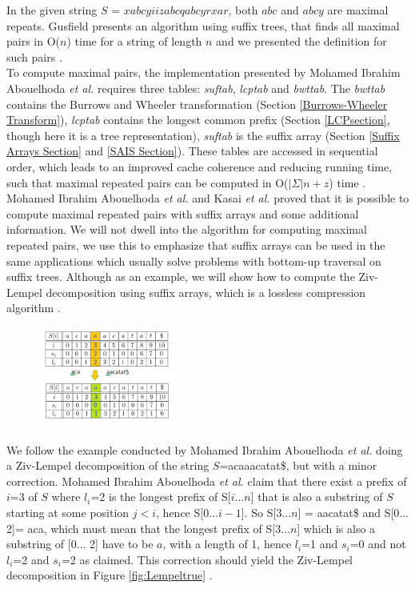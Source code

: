 \documentclass[12pt]{article} %
\begin{document}
In the given string $S$ = $xabcyiizabcqabcyrxar$, both $abc$ and $abcy$ are maximal repeats. Gusfield presents an algorithm using suffix trees, that finds all maximal pairs in O($n$) time for a string of length $n$ and we presented the definition for such pairs \cite{gusfield}.
\\
To compute maximal pairs, the implementation presented by Mohamed Ibrahim Abouelhoda \emph{et al.} \cite{enchancedsuffix} requires three tables: \emph{suftab}, \emph{lcptab} and \emph{bwttab}. The \emph{bwttab} contains the Burrows and Wheeler transformation (Section \ref{Burrows-Wheeler Transform}),  \emph{lcptab} contains the  longest common prefix (Section \ref{LCPsection}, though here it is a tree representation), \emph{suftab} is the suffix array (Section \ref{Suffix Arrays Section} and \ref{SAIS Section})\cite{enchancedsuffix}. These tables are accessed in sequential order, which leads to an improved cache coherence and reducing running time, such that maximal repeated pairs can be computed in O($|\Sigma|n + z$)  time \cite{enchancedsuffix}. Mohamed Ibrahim Abouelhoda \emph{et al.} \cite{enchancedsuffix} and Kasai \emph{et al.} \cite{Kasai} proved that it is possible to compute maximal repeated pairs with suffix arrays and some additional information. We will not dwell into the algorithm for computing maximal repeated pairs, we use this to emphasize that suffix arrays can be used in the same applications which usually solve problems with bottom-up traversal on suffix trees. Although as an example, we will show how to compute the Ziv-Lempel decomposition using suffix arrays, which is a lossless compression algorithm \cite{LempelZiv}.

\begin{figure}[H]
    \centering
    \includegraphics[width=0.4\textwidth]{LempelWrong}
    \captionsetup{width=0.8
    \textwidth}
    \caption{}
    \label{fig:LempelWrong}
\end{figure}

We follow the example conducted by Mohamed Ibrahim Abouelhoda \emph{et al.} doing a Ziv-Lempel decomposition of the string $S$=acaaacatat\$, but with a minor correction. Mohamed Ibrahim Abouelhoda \emph{et al.} claim that there exist a prefix of $i$=3 of $S$ where $l_i$=2 is the longest prefix of S[$i \ldots n$] that is also a substring of $S$ starting at some position $j < i$, hence S[$0 \ldots i-1$]. So S[$3 \ldots n$] = aacatat\$ and S[$0 \ldots$ 2]= aca, which must mean that the longest prefix of S[$3 \ldots n$] which is also a substring of [$0 \ldots$ 2] have to be $a$, with a length of 1, hence $l_i$=1 and $s_i$=0 and not $l_i$=2 and $s_i$=2 as claimed. This correction should yield the Ziv-Lempel decomposition in Figure \ref{fig:Lempeltrue} \cite{enchancedsuffix}.
\end{document}
